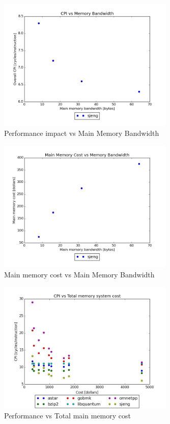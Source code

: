 \documentclass{article}
\begin{document}
\begin{figure}[ht]
    \centering
    \includegraphics[width=0.75\textwidth]{plots/CPI_vs_Bandwidth.png}
    \caption{Performance impact vs Main Memory Bandwidth}
    \label{fig:cpivsbandwidth}
\end{figure}

\begin{figure}[ht]
    \centering
    \includegraphics[width=0.75\textwidth]{plots/Cost_vs_Bandwidth.png}
    \caption{Main memory cost vs Main Memory Bandwidth}
    \label{fig:costvsbandwidth}
\end{figure}

\begin{figure}[ht]
    \centering
    \includegraphics[width=0.75\textwidth]{plots/CPI_vs_Total_memory_system_cost.png}
    \caption{Performance vs Total main memory cost}
    \label{fig:cpivstotalcost}
\end{figure}
\end{document}
